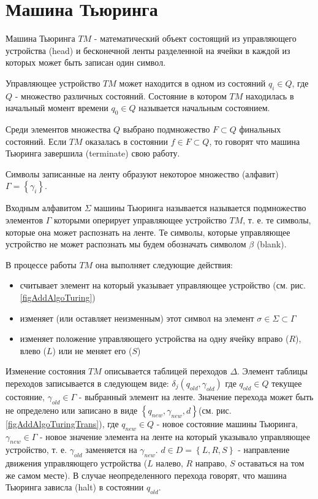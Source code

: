 \section{Машина Тьюринга}
\label{addTuring}

Машина Тьюринга $TM$ - математический объект состоящий из
управляющего устройства (head) и бесконечной ленты разделенной на
ячейки в каждой из которых может быть записан один символ.



Управляющее устройство $TM$ может находится в одном из состояний $q_i
\in Q$, где $Q$ 
- множество различных состояний. Состояние в котором $TM$ находилась в
начальный момент времени $q_0 \in Q$ называется начальным состоянием. 

Среди элементов множества $Q$ выбрано подмножество $F \subset Q$
финальных состояний. Если $TM$ оказалась в состоянии $f \in F \subset
Q$, то говорят что машина Тьюринга завершила (terminate) свою работу.

Символы записанные на ленту образуют некоторое множество (алфавит)
$\Gamma = \left\{\gamma_i\right\}$.

Входным алфавитом $\Sigma$ машины Тьюринга называется называется
подмножество элементов $\Gamma$ которыми оперирует управляющее устройство $TM$,
т. е. те символы, которые она может распознать на ленте. Те символы,
которые управляющее устройство не может распознать мы будем обозначать символом
$\beta$ (blank).

В процессе работы $TM$ она выполняет следующие действия:
\begin{itemize}
\item{считывает элемент на который указывает управляющее устройство
  (см. рис. \ref{figAddAlgoTuring})}
\item{изменяет (или оставляет неизменным) этот символ на элемент
  $\sigma \in \Sigma \subset \Gamma$}
\item{изменяет положение управляющего устройства на одну ячейку вправо
  ($R$), влево ($L$) или не меняет его ($S$)}
\end{itemize}



Изменение состояния $TM$ описывается таблицей переходов
$\Delta$. Элемент таблицы переходов записывается в следующем виде: 
$\delta_j\left(q_{old}, \gamma_{old}\right)$ где $q_{old} \in Q$ текущее состояние,
$\gamma_{old} \in \Gamma$ - выбранный элемент на ленте. Значение
перехода может быть 
не определено или записано в виде $\left\{q_{new}, \gamma_{new},
d\right\}$(см. рис. \ref{figAddAlgoTuringTrans}), где
$q_{new} \in Q$ - новое состояние машины Тьюринга, $\gamma_{new} \in \Gamma$ -
новое значение элемента на ленте на который указывало управляющее устройство,
т. е. $\gamma_{old}$ заменяется на $\gamma_{new}$. $d \in D =
\left\{L, R, S\right\}$ - направление
движения управляющего устройства ($L$ налево, $R$ направо, $S$
оставаться на том же самом месте). В случае неопределенного
перехода говорят, что машина Тьюринга зависла (halt) в состоянии $q_{old}$.



